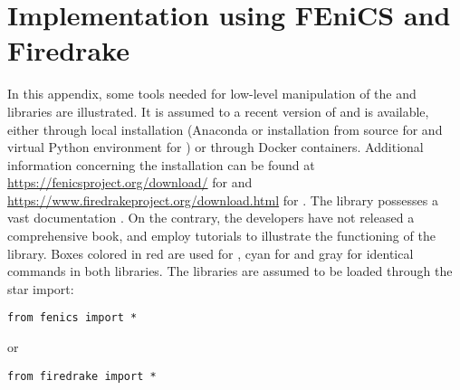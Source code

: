 \chapter{Implementation using FEniCS and Firedrake}

In this appendix, some tools needed for low-level manipulation of the \fenics and \firedrake libraries are illustrated. It is assumed to a recent version of \fenics and \firedrake is available, either through local installation (Anaconda or installation from source for \fenics and virtual Python environment for \firedrake) or through Docker containers. Additional information concerning the installation can be found at \url{https://fenicsproject.org/download/} for \fenics and \url{https://www.firedrakeproject.org/download.html} for \firedrake. The \fenics library possesses a vast documentation \cite{logg2012}. On the contrary, the \firedrake developers have not released a comprehensive book, and employ tutorials to illustrate the functioning of the library. Boxes colored in red are used for \textcolor{red}{\fenics}, cyan for \textcolor{cyan}{\firedrake} and gray for identical commands in both libraries. The libraries are assumed to be loaded through the star import:	
\begin{verbatim}
from fenics import *
\end{verbatim}
or
\begin{verbatim}
from firedrake import *
\end{verbatim}
